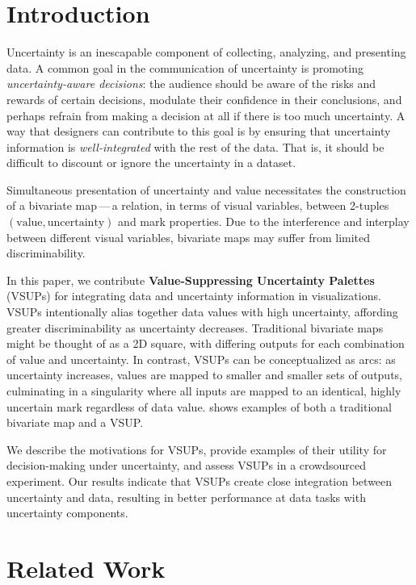 \section{Introduction}
\exampleFig

Uncertainty is an inescapable component of collecting, analyzing, and presenting data. A common goal in the communication of uncertainty is promoting \emph{uncertainty-aware decisions}: the audience should be aware of the risks and rewards of certain decisions, modulate their confidence in their conclusions, and perhaps refrain from making a decision at all if there is too much uncertainty.  A way that designers can contribute to this goal is by ensuring that uncertainty information is \emph{well-integrated} with the rest of the data. That is, it should be difficult to discount or ignore the uncertainty in a dataset.

Simultaneous presentation of uncertainty and value necessitates the construction of a bivariate map\,---\,a relation, in terms of visual variables, between 2-tuples $(\text{value}, \text{uncertainty})$ and mark properties. Due to the interference and interplay between different visual variables, bivariate maps may suffer from limited discriminability.

In this paper, we contribute \textbf{Value-Suppressing Uncertainty Palettes} (VSUPs) for integrating data and uncertainty information in visualizations.
VSUPs intentionally alias together data values with high uncertainty, affording greater discriminability as uncertainty decreases. Traditional bivariate maps might be thought of as a 2D square, with differing outputs for each combination of value and uncertainty. In contrast, VSUPs can be conceptualized as arcs: as uncertainty increases, values are mapped to smaller and smaller sets of outputs, culminating in a singularity where all inputs are mapped to an identical, highly uncertain mark regardless of data value.  shows examples of both a traditional bivariate map and a VSUP.

We describe the motivations for VSUPs, provide examples of their utility for decision-making under uncertainty, and assess VSUPs in a crowdsourced experiment. Our results indicate that VSUPs create close integration between uncertainty and data, resulting in better performance at data tasks with uncertainty components.

\section{Related Work}

